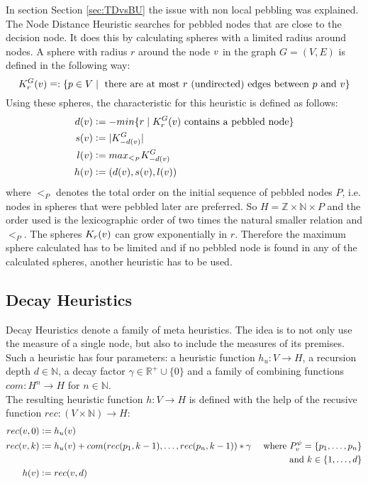 \documentclass{llncs}
\newcommand{\defeq}{\mathrel{\mathop:}=}
\newcommand{\eqdef}{\mathrel{\mathop=}:}
\begin{document}
In section Section \ref{sec:TDvsBU} the issue with non local pebbling was explained.
The Node Distance Heuristic searches for pebbled nodes that are close to the decision node.
It does this by calculating spheres with a limited radius around nodes.
A sphere with radius $r$ around the node $v$ in the graph $G = (V,E)$ is defined in the following way: 
$$K_r^{G}(\n) \eqdef \{p \in V \mid \text{ there are at most } r \text{ (undirected) edges between } p \text{ and } \n\}$$
Using these spheres, the characteristic for this heuristic is defined as follows:
\begin{align*}
d(\n) &\defeq -min\{r \mid K_r^{G}(\n)\text{ contains a pebbled node}\}\\
	s(\n) &\defeq |K_{-d(\n)}^G|\\
	l(\n) &\defeq max_{<_P}K_{-d(\n)}^G\\
	h(\n) &\defeq (d(\n),s(\n),l(\n))
\end{align*}
where $<_P$ denotes the total order on the initial sequence of pebbled nodes $P$, i.e. nodes in spheres that were pebbled later are preferred.
So $H = \mathbb{Z} \times \mathbb{N} \times P$ and the order used is the lexicographic order of two times the natural smaller relation and $<_P$.
The spheres $K_r(v)$ can grow exponentially in $r$. Therefore the maximum sphere calculated has to be limited and if no pebbled node is found in any of the calculated spheres, another heuristic has to be used.

\subsection{Decay Heuristics}

Decay Heuristics denote a family of meta heuristics. 
The idea is to not only use the measure of a single node, but also to include the measures of its premises.
Such a heuristic has four parameters: a heuristic function $h_u: V \rightarrow H$, a recursion depth $d \in \mathbb{N}$, a decay factor $\gamma \in \mathbb{R}^+ \cup \{0\}$ and a family of combining functions $com: H^n \rightarrow H$ for $n \in \mathbb{N}$.\\
The resulting heuristic function $h: V \rightarrow H$ is defined with the help of the recusive function $rec: (V \times \mathbb{N}) \rightarrow H$:
\begin{align*}
	rec(\n,0) &\defeq h_u(\n) &\\
	rec(\n,k) &\defeq h_u(\n) + com(rec(p_1,k-1),\ldots,rec(p_n,k-1)) * \gamma & \text{ where } \Premises{\n}{\psi} = \{p_1,\ldots,p_n\}\\& & \text{ and } k \in \{1,\ldots,d\} \\
	h(\n) &\defeq rec(\n,d) &
\end{align*}
\end{document}
